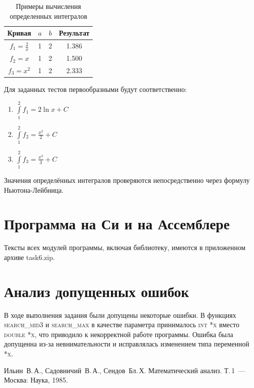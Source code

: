 \documentclass[a4paper,12pt,titlepage,finall]{article}
\begin{document}
\begin{table}[h]
\centering
\begin{tabular}{|c|c|c|c|}
\hline
Кривая & $a$ & $b$ & Результат \\
\hline
$f_1 = \frac{2}{x}$ & 1 & 2 & 1.386 \\
$f_2 = x$ & 1 & 2 & 1.500 \\
$f_3 = x^2$ & 1 & 2 & 2.333 \\
\hline
\end{tabular}
\caption{Примеры вычисления определенных интегралов}
\label{table3}
\end{table}

Для заданных тестов первообразными будут соответственно:
\begin{enumerate}
    \item $\int\limits_1^2 f_1 = 2\ln x + C$
    \item $\int\limits_1^2 f_2 = \frac{x^2}{2} + C$
    \item $\int\limits_1^2 f_3 = \frac{x^3}{3} + C$
\end{enumerate}

Значения определённых интегралов проверяются непосредственно через формулу Ньютона-Лейбница.

\section{Программа на Си и на Ассемблере}

Тексты всех модулей программы, включая библиотеку, имеются в приложенном архиве task6.zip.

\section{Анализ допущенных ошибок}

В ходе выполнения задания были допущены некоторые ошибки. В функциях \textsc{search\_mid3} и \textsc{search\_max} в качестве параметра принималось \textsc{int *x} вместо \textsc{double *x}, что приводило к некорректной работе программы. Ошибка была допущенна из-за невнимательности и исправлялась изменением типа переменной \textsc{*x}.

\newpage
\begin{raggedright}
\begin{thebibliography}{99}
 Ильин~В.\,А., Садовничий~В.\,А., Сендов~Бл.\,Х. Математический анализ. Т.\,1~---
    Москва: Наука, 1985.
\end{thebibliography}
\end{raggedright}
\end{document}

